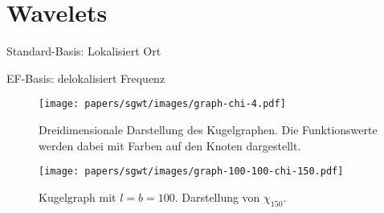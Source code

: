 
\section{Wavelets\label{sec:sgwt:wavelets}}

Standard-Basis: Lokalisiert Ort

EF-Basis: delokalisiert Frequenz


\begin{figure}
    \centering
    \texttt{[image: papers/sgwt/images/graph-chi-4.pdf]}
    \vspace{-80pt}
    \caption{Dreidimensionale Darstellung des Kugelgraphen. Die Funktionswerte 
        werden dabei mit Farben auf den Knoten dargestellt. 
        \label{fig:sgwt:sphere:graph:chi}}
\end{figure}

\begin{figure}
    \centering
    \texttt{[image: papers/sgwt/images/graph-100-100-chi-150.pdf]}
    \vspace{-80pt}
    \caption{Kugelgraph mit $l = b = 100$. Darstellung von $\chi_{150}$.
        \label{fig:sgwt:sphere:graph:chi:hh}}
\end{figure}

